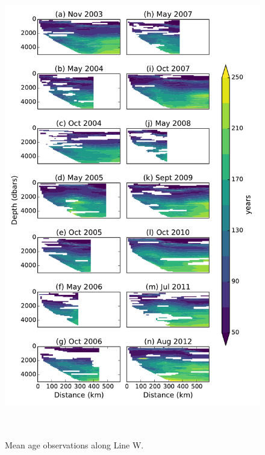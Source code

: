 \documentclass[11pt]{article}
\begin{document}
\begin{figure}[b!]
    \centering
    \includegraphics[height=8in]{linew_age_obs.pdf}
    \caption{Mean age observations along Line W. }
\end{figure}
\end{document}
